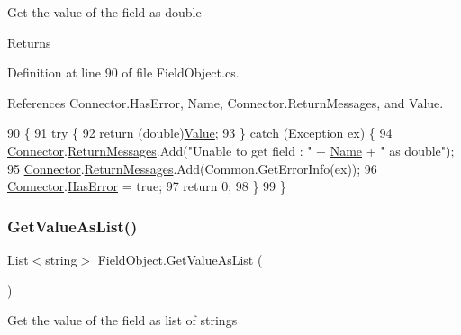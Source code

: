 Get the value of the field as double 

\begin{DoxyReturn}{Returns}

\end{DoxyReturn}


Definition at line 90 of file Field\+Object.\+cs.



References Connector.\+Has\+Error, Name, Connector.\+Return\+Messages, and Value.


\begin{DoxyCode}
90                                      \{
91         \textcolor{keywordflow}{try} \{
92             \textcolor{keywordflow}{return} (\textcolor{keywordtype}{double})\mbox{\hyperlink{class_field_object_a9764fb1824cec95b82cd6ac0b4cd8919}{Value}};
93         \} \textcolor{keywordflow}{catch} (Exception ex) \{
94             \mbox{\hyperlink{class_connector}{Connector}}.\mbox{\hyperlink{class_connector_a1ed422674b344524fd77998dcf6a9ba6}{ReturnMessages}}.Add(\textcolor{stringliteral}{"Unable to get field : "} + 
      \mbox{\hyperlink{class_field_object_ae5d972e96a3eca93407da8e8a89abfd1}{Name}} + \textcolor{stringliteral}{" as double"});
95             \mbox{\hyperlink{class_connector}{Connector}}.\mbox{\hyperlink{class_connector_a1ed422674b344524fd77998dcf6a9ba6}{ReturnMessages}}.Add(Common.GetErrorInfo(ex));
96             \mbox{\hyperlink{class_connector}{Connector}}.\mbox{\hyperlink{class_connector_a9365777a6b7b711b75bcfa6c4d53e989}{HasError}} = \textcolor{keyword}{true};
97             \textcolor{keywordflow}{return} 0;
98         \}
99     \}
\end{DoxyCode}
\mbox{\label{class_field_object_a635d7598cbf7bbc29821cb1c012de964}} 
\subsubsection{\texorpdfstring{Get\+Value\+As\+List()}{GetValueAsList()}}
{\footnotesize\ttfamily List$<$string$>$ Field\+Object.\+Get\+Value\+As\+List (\begin{DoxyParamCaption}{ }\end{DoxyParamCaption})}



Get the value of the field as list of strings 

